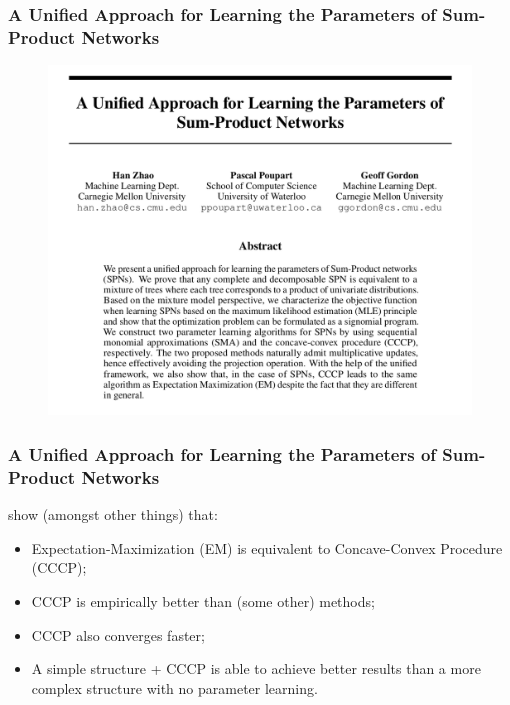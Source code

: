 \documentclass[usenames,dvipsnames]{beamer}
\begin{document}
\begin{frame}
  \frametitle{A Unified Approach for Learning the Parameters of Sum-Product Networks}

  \begin{figure}
    \centering\includegraphics[height=0.7\textheight]{imgs/unified.png}
  \end{figure}
\end{frame}

\begin{frame}
  \frametitle{A Unified Approach for Learning the Parameters of Sum-Product Networks}

  \cite{unified} show (amongst other things) that:
  \begin{itemize}
    \item Expectation-Maximization (EM) is equivalent to Concave-Convex Procedure (CCCP);
    \item CCCP is empirically better than (some other) methods;
    \item CCCP also converges faster;
    \item A simple structure + CCCP is able to achieve better results than a more complex structure
      with no parameter learning.
  \end{itemize}
\end{frame}
\end{document}
